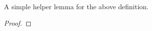 \begin{theorem}
\label{sum_moebius_sq_divisors_apply}
\leanok
A simple helper lemma for the above definition.
\end{theorem}
\begin{proof}
\leanok
\end{proof}
